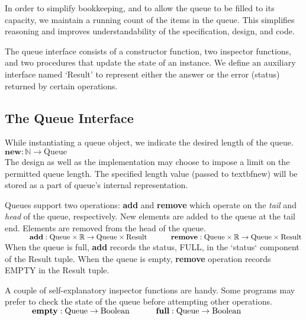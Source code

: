 \documentclass[10pt]{article}
\begin{document}
  In order to simplify bookkeeping, and to allow the queue to be filled to its capacity, we maintain a running count of the items in the queue. This simplifies reasoning and improves understandability of the specification, design, and code.

  The queue interface consists of a constructor function, two inspector functions, and two procedures that update the state of an instance. We define an auxiliary interface named `Result' to represent either the answer or the error (status) returned by certain operations.   
  
  \subsection{The Queue Interface}
  \noindent While instantiating a queue object, we indicate the desired length of the queue. 
  \vspace*{6pt}\\\hspace*{32pt}\(
  \textbf{new}: \mathbb{N} \rightarrow \mathrm{Queue}
  \)\vspace*{6pt}\\
  The design as well as the implementation may choose to impose a limit on the permitted queue length. The specified length value (passed to textbf{new}) will be stored as a part of queue's internal representation. 

  Queues support two operations: \textbf{add} and \textbf{remove} which operate on the \emph{tail} and \emph{head} of the queue, respectively. New elements are added to the queue at the tail end. Elements are removed from the head of the queue.
  \vspace*{6pt}\\\(
      \hspace*{32pt}\textbf{add}: \mathrm{Queue} \times \mathbb{R} \rightarrow \mathrm{Queue \times Result}\vspace*{6pt}\\
      \hspace*{32pt}\textbf{remove}: \mathrm{Queue} \times \mathbb{R} \rightarrow \mathrm{Queue \times Result}
  \)\vspace*{6pt}\\
  When the queue is full, \textbf{add} records the status, FULL, in the `status` component of the Result tuple. When the queue is empty, \textbf{remove} operation records EMPTY in the Result tuple. 

  A couple of self-explanatory inspector functions are handy. Some programs may prefer to check the state of the queue before attempting other operations.
  \vspace*{6pt}\\\(
  \hspace*{32pt}\textbf{empty}: \mathrm{Queue} \rightarrow \mathrm{Boolean}\vspace*{4pt}\\
  \hspace*{32pt}\textbf{full}: \mathrm{Queue} \rightarrow \mathrm{Boolean}
  \)\vspace*{6pt}
\end{document}
